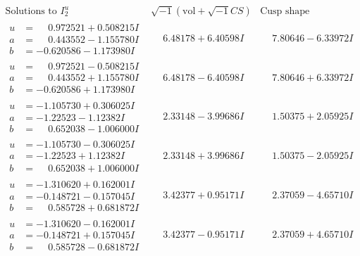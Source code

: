 \documentclass[1p]{elsarticle_modified}
\theoremstyle{definition}
\newcommand{\I}{\sqrt{-1}}
\begin{document}
$$\begin{array}{c|c|c}  
\text{Solutions to }I^u_{2}& \I (\text{vol} + \sqrt{-1}CS) & \text{Cusp shape}\\
 \hline 
\begin{aligned}
u &= \phantom{-}0.972521 + 0.508215 I \\
a &= \phantom{-}0.443552 - 1.155780 I \\
b &= -0.620586 - 1.173980 I\end{aligned}
 & \phantom{-}6.48178 + 6.40598 I & \phantom{-}7.80646 - 6.33972 I \\ \hline\begin{aligned}
u &= \phantom{-}0.972521 - 0.508215 I \\
a &= \phantom{-}0.443552 + 1.155780 I \\
b &= -0.620586 + 1.173980 I\end{aligned}
 & \phantom{-}6.48178 - 6.40598 I & \phantom{-}7.80646 + 6.33972 I \\ \hline\begin{aligned}
u &= -1.105730 + 0.306025 I \\
a &= -1.22523 - 1.12382 I \\
b &= \phantom{-}0.652038 - 1.006000 I\end{aligned}
 & \phantom{-}2.33148 - 3.99686 I & \phantom{-}1.50375 + 2.05925 I \\ \hline\begin{aligned}
u &= -1.105730 - 0.306025 I \\
a &= -1.22523 + 1.12382 I \\
b &= \phantom{-}0.652038 + 1.006000 I\end{aligned}
 & \phantom{-}2.33148 + 3.99686 I & \phantom{-}1.50375 - 2.05925 I \\ \hline\begin{aligned}
u &= -1.310620 + 0.162001 I \\
a &= -0.148721 - 0.157045 I \\
b &= \phantom{-}0.585728 + 0.681872 I\end{aligned}
 & \phantom{-}3.42377 + 0.95171 I & \phantom{-}2.37059 - 4.65710 I \\ \hline\begin{aligned}
u &= -1.310620 - 0.162001 I \\
a &= -0.148721 + 0.157045 I \\
b &= \phantom{-}0.585728 - 0.681872 I\end{aligned}
 & \phantom{-}3.42377 - 0.95171 I & \phantom{-}2.37059 + 4.65710 I \\ \hline\begin{aligned}

\end{aligned}
\end{array}$$
\end{document}

